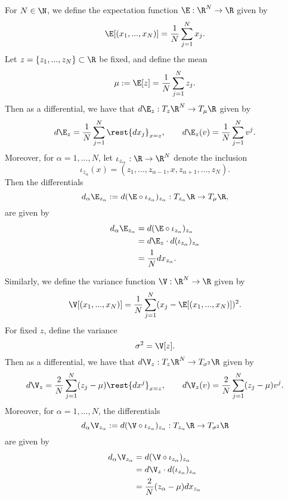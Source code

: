 \begin{comment}
	&\qquad+\left(((\sigma^2)^i+\epsilon)^{-1/2}(-\delta^i_\rho)\right)\left(\frac{1}{N}\delta^\rho_\nu\right)\\
	&\qquad +\left(((\sigma^2)^i+\epsilon)^{-1/2})\delta_{j_0}^\lambda\delta_\nu^i\right)\\
	&=\left(-\frac{1}{N}((\sigma^2)^i+\epsilon)^{-3/2}(x^i-\mu^i)\delta^i_\nu(x^\nu_\lambda-\mu^\nu)\right)\\
	&\qquad+\left(\frac{-1}{N}((\sigma^2)^i+\epsilon)^{-1/2}\delta^i_\nu\right)+\left(((\sigma^2)^i+\epsilon)^{-1/2})\delta_{j_0}^\lambda\delta_\nu^i\right)
\end{align*}
\end{proof}

\end{comment}



\begin{lem}
	For $N\in\N$, we define the expectation function $\E:\R^N\to\R$ given by
	$$\E[(x_1,...,x_N)]=\frac{1}{N}\sum_{j=1}^Nx_j.$$
	Let $z=\{z_1,...,z_N\}\subset\R$ be fixed, and define the mean
	$$\mu:=\E[z]=\frac{1}{N}\sum_{j=1}^Nz_j.$$
	Then as a differential, we have that $d\E_z:T_z\R^N\to T_\mu\R$ given by
	$$d\E_z=\frac{1}{N}\sum_{j=1}^N\rest{dx_j}_{x=z},\qquad d\E_z(v)=\frac{1}{N}\sum_{j=1}^Nv^j.$$
	Moreover, for $\alpha=1,...,N$, let
	$\iota_{z_\alpha}:\R\to\R^N$ denote the inclusion
	$$\iota_{z_\alpha}(x)=(z_1,...,z_{\alpha-1},x,z_{\alpha+1},...,z_N).$$
	Then the differentials
	$$d_\alpha\E_{z_\alpha}:=d(\E\circ\iota_{z_\alpha})_{z_\alpha}:T_{z_\alpha}\R\to T_\mu\R,$$
	are given by
	\begin{align*}
		d_\alpha\E_{z_\alpha}&=d(\E\circ\iota_{z_\alpha})_{z_\alpha}\\
		&=d\E_z\cdot d(\iota_{z_\alpha})_{z_\alpha}\\
		&=\frac{1}{N}dx_{z_\alpha}.
	\end{align*}
	
	
	
	Similarly, we define the variance function $\V:\R^N\to\R$ given by
	$$\V[(x_1,...,x_N)]=\frac{1}{N}\sum_{j=1}^N(x_j-\E[(x_1,...,x_N)])^2.$$
	For fixed $z$, define the variance
	$$\sigma^2=\V[z].$$
	Then as a differential, we have that $d\V_z:T_z\R^N\to T_{\sigma^2}\R$ given by
	$$d\V_z=\frac{2}{N}\sum_{j=1}^N(z_j-\mu)\rest{dx^j}_{x=z},\qquad d\V_z(v)=\frac{2}{N}\sum_{j=1}^N(z_j-\mu)v^j.$$
	Moreover, for $\alpha=1,...,N$, the differentials
	$$d_\alpha\V_{z_\alpha}:=d(\V\circ\iota_{z_\alpha})_{z_{\alpha}}:T_{z_\alpha}\R\to T_{\sigma^2}\R$$
	are given by
	\begin{align*}
		d_\alpha\V_{z_\alpha}&=d(\V\circ\iota_{z_\alpha})_{z_\alpha}\\
		&=d\V_z\cdot d(\iota_{z_\alpha})_{z_\alpha}\\
		&=\frac{2}{N}(z_\alpha-\mu)dx_{z_\alpha}
	\end{align*}
\end{lem}

